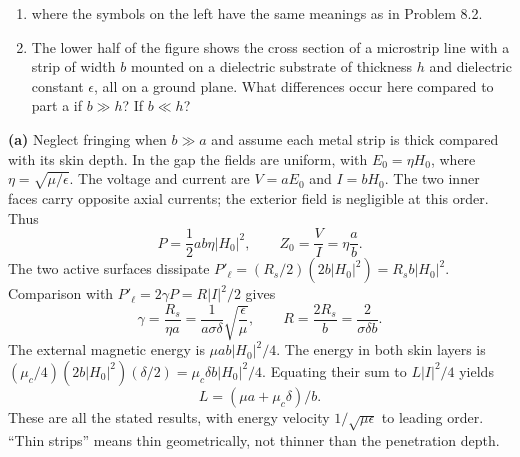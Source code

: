 \begin{center}
\end{center}

\begin{enumerate}
\item[] where the symbols on the left have the same meanings as in Problem 8.2.
\item[(b)] The lower half of the figure shows the cross section of a microstrip line with a strip of width $b$ mounted on a dielectric substrate of thickness $h$ and dielectric constant $\epsilon$, all on a ground plane. What differences occur here compared to part a if $b\gg h$? If $b\ll h$?
\end{enumerate}
\solution

\textbf{(a)} Neglect fringing when $b\gg a$ and assume each metal
strip is thick compared with its skin depth.  In the gap the fields
are uniform, with $E_0=\eta H_0$, where
$\eta=\sqrt{\mu/\epsilon}$.  The voltage and current are
$V=aE_0$ and $I=bH_0$.  The two inner faces carry opposite axial
currents; the exterior field is negligible at this order.  Thus
\[
P=\frac12ab\eta|H_0|^2,\qquad
Z_0=\frac VI=\eta\frac ab.
\]
The two active surfaces dissipate
$P'_\ell=(R_s/2)(2b|H_0|^2)=R_sb|H_0|^2$.
Comparison with $P'_\ell=2\gamma P=R|I|^2/2$ gives
\[
\boxed{\gamma=\frac{R_s}{\eta a}
=\frac1{a\sigma\delta}\sqrt{\frac\epsilon\mu},\qquad
R=\frac{2R_s}{b}=\frac2{\sigma\delta b}.}
\]
The external magnetic energy is $\mu ab|H_0|^2/4$.
The energy in both skin layers is
$(\mu_c/4)(2b|H_0|^2)(\delta/2)=\mu_c\delta b|H_0|^2/4$.
Equating their sum to $L|I|^2/4$ yields
\[
\boxed{L=(\mu a+\mu_c\delta)/b.}
\]
These are all the stated results, with energy velocity
$1/\sqrt{\mu\epsilon}$ to leading order.  ``Thin strips'' means
thin geometrically, not thinner than the penetration depth.

